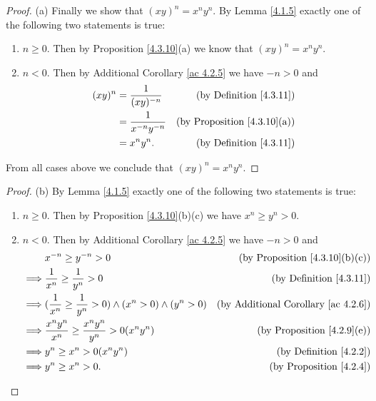 \begin{proof}{(a)}
    Finally we show that \((xy)^n = x^n y^n\).
    By Lemma \ref{4.1.5} exactly one of the following two statements is true:
    \begin{enumerate}[label=(\Roman*)]
        \item \(n \geq 0\).
              Then by Proposition \ref{4.3.10}(a) we know that \((xy)^n = x^n y^n\).
        \item \(n < 0\).
              Then by Additional Corollary \ref{ac 4.2.5} we have \(-n > 0\) and
              \begin{align*}
                  (xy)^n & = \frac{1}{(xy)^{-n}}     & \text{(by Definition \ref{4.3.11})}     \\
                         & = \frac{1}{x^{-n} y^{-n}} & \text{(by Proposition \ref{4.3.10}(a))} \\
                         & = x^n y^n.                & \text{(by Definition \ref{4.3.11})}
              \end{align*}
    \end{enumerate}
    From all cases above we conclude that \((xy)^n = x^n y^n\).
\end{proof}

\begin{proof}{(b)}
    By Lemma \ref{4.1.5} exactly one of the following two statements is true:
    \begin{enumerate}[label=(\Roman*)]
        \item \(n \geq 0\).
              Then by Proposition \ref{4.3.10}(b)(c) we have \(x^n \geq y^n > 0\).
        \item \(n < 0\).
              Then by Additional Corollary \ref{ac 4.2.5} we have \(-n > 0\) and
              \begin{align*}
                           & x^{-n} \geq y^{-n} > 0                                                 & \text{(by Proposition \ref{4.3.10}(b)(c))}      \\
                  \implies & \frac{1}{x^n} \geq \frac{1}{y^n} > 0                                   & \text{(by Definition \ref{4.3.11})}             \\
                  \implies & (\frac{1}{x^n} \geq \frac{1}{y^n} > 0) \land (x^n > 0) \land (y^n > 0) & \text{(by Additional Corollary \ref{ac 4.2.6})} \\
                  \implies & \frac{x^n y^n}{x^n} \geq \frac{x^n y^n}{y^n} > 0(x^n y^n)              & \text{(by Proposition \ref{4.2.9}(e))}          \\
                  \implies & y^n \geq x^n > 0(x^n y^n)                                              & \text{(by Definition \ref{4.2.2})}              \\
                  \implies & y^n \geq x^n > 0.                                                      & \text{(by Proposition \ref{4.2.4})}
              \end{align*}
    \end{enumerate}
\end{proof}

